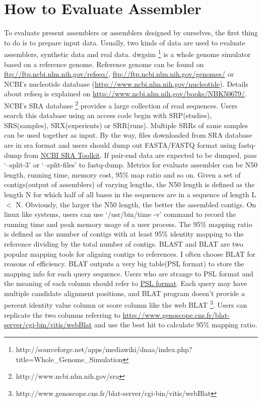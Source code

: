 \documentclass{article}
\begin{document}
\section{How to Evaluate Assembler}
To evaluate present assemblers or assemblers designed by ourselves, the first thing to do is to prepare input data. Usually, two kinds of data are used to evaluate assemblers, synthetic data and real data. dwgsim \footnote{http://sourceforge.net/apps/mediawiki/dnaa/index.php?title=Whole\_Genome\_Simulation} is a whole genome simulator based on a reference genome. Reference genome can be found on \href{ftp://ftp.ncbi.nlm.nih.gov/refseq/}{ftp://ftp.ncbi.nlm.nih.gov/refseq/}, \href{ftp://ftp.ncbi.nlm.nih.gov/genomes/}{ftp://ftp.ncbi.nlm.nih.gov/genomes/} or NCBI's nucleotide database (\href{http://www.ncbi.nlm.nih.gov/nucleotide}{http://www.ncbi.nlm.nih.gov/nucleotide}). Details about refseq is explained on \href{http://www.ncbi.nlm.nih.gov/books/NBK50679/}{http://www.ncbi.nlm.nih.gov/books/NBK50679/}. NCBI's SRA database \footnote{http://www.ncbi.nlm.nih.gov/sra} provides a large collection of read sequences. Users search this database using an access code begin with SRP(studies), SRS(samples), SRX(experients) or SRR(runs). Multiple SRRs of same samples can be used together as input. By the way, files downloaded from SRA database are in sra format and users should dump out FASTA/FASTQ format using fastq-dump from \href{http://trace.ncbi.nlm.nih.gov/Traces/sra/sra.cgi?view=software}{NCBI SRA Toolkit}. If pair-end data are expected to be dumped, pass `--split-3' or `--split-files' to fastq-dump. Metrics for evaluate assembler can be N50 length, running time, memory cost, 95\% map ratio and so on. Given a set of contigs(output of assemblers) of varying lengths, the N50 length is defined as the length N for which half of all bases in the sequences are in a sequence of length L $<$ N. Obviously, the larger the N50 length, the better the assembled contigs. On linux like systems, users can use `/usr/bin/time -v' command to record the running time and peak memory usage of a user process. The 95\% mapping ratio is defined as the number of contigs with at least 95\% identity mapping to the reference dividing by the total number of contigs. BLAST \cite{altschul1990basic} and BLAT \cite{kent2002blat} are two popular mapping tools for aligning contigs to references. I often choose BLAT for reasons of efficiency. BLAT outputs a very big table(PSL format) to store the mapping info for each query sequence. Users who are strange to PSL format and the meaning of each column should refer to \href{http://genome.ucsc.edu/FAQ/FAQformat.html#format2}{PSL format}. Each query may have multiple candidate alignment positions, and BLAT program doesn't provide a percent identity value column or score column like the web BLAT \footnote{http://www.genoscope.cns.fr/blat-server/cgi-bin/vitis/webBlat}. Users can replicate the two columns referring to \href{http://www.genoscope.cns.fr/blat-server/cgi-bin/vitis/webBlat}{http://www.genoscope.cns.fr/blat-server/cgi-bin/vitis/webBlat} and use the best hit to calculate 95\% mapping ratio.
\end{document}
